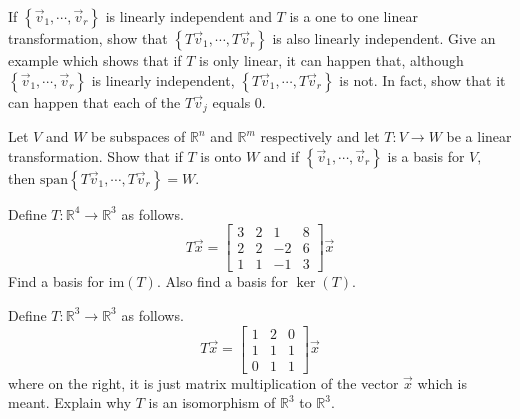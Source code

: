 \documentclass{ximera}
\begin{document}
\begin{problem}\label{prb:10.77} If $\left\{ \vec{v}_{1},\cdots ,\vec{v}_{r}\right\} $ is linearly
independent and $T$ is a one to one linear transformation, show that $
\left\{ T\vec{v}_{1},\cdots ,T\vec{v}_{r}\right\} $ is also linearly
independent. Give an example which shows that if $T$ is only linear, it can
happen that, although $\left\{ \vec{v}_{1},\cdots ,\vec{v}_{r}\right\} $ is
linearly independent, $\left\{ T\vec{v}_{1},\cdots ,T\vec{v}_{r}\right\} $
is not. In fact, show that it can happen that each of the $T\vec{v}_{j}$
equals 0.
\end{problem}


\begin{problem}\label{prb:10.78} Let $V$ and $W$ be subspaces of $\mathbb{R}^{n}$ and $\mathbb{R}^{m}$
respectively and let $T:V\rightarrow W$ be a linear transformation. Show
that if $T$ is onto $W$ and if $\left\{ \vec{v}_{1},\cdots ,\vec{v}
_{r}\right\} $ is a basis for $V,$ then $\mbox{span}\left\{ T\vec{v}
_{1},\cdots ,T\vec{v}_{r}\right\} =W$.
\end{problem}


\begin{problem}\label{prb:10.79} Define $T:\mathbb{R}^{4}\rightarrow \mathbb{R}^{3}$ as follows.
\begin{equation*}
T\vec{x}=\left[
\begin{array}{rrrr}
3 & 2 & 1 & 8 \\
2 & 2 & -2 & 6 \\
1 & 1 & -1 & 3
\end{array}
\right] \vec{x}
\end{equation*}
Find a basis for $\mbox{im}\left( T\right) $. Also find a basis for $\ker
\left( T\right) .$
\end{problem}


\begin{problem}\label{prb:10.80} Define $T:\mathbb{R}^{3}\rightarrow \mathbb{R}^{3}$ as follows.
\begin{equation*}
T\vec{x}=\left[
\begin{array}{ccc}
1 & 2 & 0 \\
1 & 1 & 1 \\
0 & 1 & 1
\end{array}
\right] \vec{x}
\end{equation*}
where on the right, it is just matrix multiplication of the vector $\vec{x}$
which is meant. Explain why $T$ is an isomorphism of $\mathbb{R}^{3}$ to $
\mathbb{R}^{3}$.
\end{problem}
\end{document}
